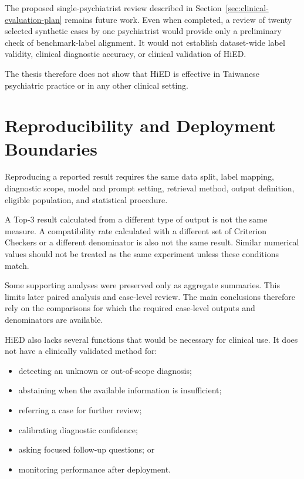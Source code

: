 \documentclass[12pt,a4paper,oneside]{report}
\begin{document}
The proposed single-psychiatrist review described in
Section~\ref{sec:clinical-evaluation-plan} remains future work. Even when
completed, a review of twenty selected synthetic cases by one
psychiatrist would provide only a preliminary check of benchmark-label
alignment. It would not establish dataset-wide label validity, clinical
diagnostic accuracy, or clinical validation of HiED.

The thesis therefore does not show that HiED is effective in Taiwanese
psychiatric practice or in any other clinical setting.

\section{Reproducibility and Deployment Boundaries}
\label{sec:clinical-deployment-boundaries}

Reproducing a reported result requires the same data split, label
mapping, diagnostic scope, model and prompt setting, retrieval method,
output definition, eligible population, and statistical procedure.

A Top-3 result calculated from a different type of output is not the
same measure. A compatibility rate calculated with a different set of
Criterion Checkers or a different denominator is also not the same
result. Similar numerical values should not be treated as the same
experiment unless these conditions match.

Some supporting analyses were preserved only as aggregate summaries.
This limits later paired analysis and case-level review. The main
conclusions therefore rely on the comparisons for which the required
case-level outputs and denominators are available.

HiED also lacks several functions that would be necessary for clinical
use. It does not have a clinically validated method for:

\begin{itemize}
    \item detecting an unknown or out-of-scope diagnosis;
    \item abstaining when the available information is insufficient;
    \item referring a case for further review;
    \item calibrating diagnostic confidence;
    \item asking focused follow-up questions; or
    \item monitoring performance after deployment.
\end{itemize}
\end{document}
